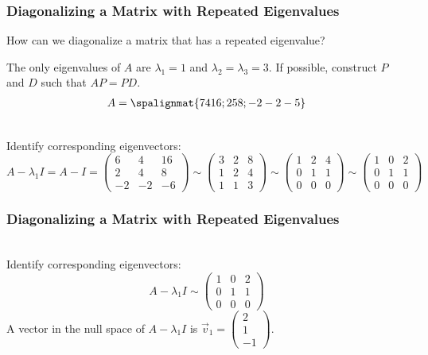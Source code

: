 \begin{frame}\frametitle{Diagonalizing a Matrix with Repeated Eigenvalues}

    How can we diagonalize a matrix that has a repeated eigenvalue? 
    
    \vspace{12pt}
    \pause 
    The only eigenvalues of $A$ are $\lambda_1 = 1$ and $\lambda_2 = \lambda_3 = 3$. If possible, construct $P$ and $D$ such that $AP = PD$.
    \begin{align*}
        A = \spalignmat{ 7 4 16; 2 5 8; -2 -2 -5 }
    \end{align*}
    
    \pause
    \vspace{6pt}
     \\
    Identify corresponding eigenvectors: \pause 
    $$A - \lambda_1 I = A - I = \begin{pmatrix} 6 & 4 & 16 \\ 2 & 4 & 8 \\ -2 & -2 & -6 \end{pmatrix} \sim \begin{pmatrix} 3 & 2 & 8 \\ 1 & 2 & 4 \\ 1 & 1 & 3 \end{pmatrix} \sim \begin{pmatrix} 1 & 2 & 4 \\ 0 & 1 & 1 \\ 0 & 0 & 0 \end{pmatrix}
    \sim \begin{pmatrix} 1 & 0 & 2 \\ 0 & 1 & 1 \\ 0 & 0 & 0 \end{pmatrix}
    $$
\end{frame}



\begin{frame}\frametitle{Diagonalizing a Matrix with Repeated Eigenvalues}

     \\ \pause 
    Identify corresponding eigenvectors: 
    $$A - \lambda_1 I 
    \sim \begin{pmatrix} 1 & 0 & 2 \\ 0 & 1 & 1 \\ 0 & 0 & 0 \end{pmatrix}
    $$
    A vector in the null space of $A - \lambda_1 I$ is $\vec v_1 = \begin{pmatrix} 2\\1\\-1 \end{pmatrix}$. 
\end{frame}



